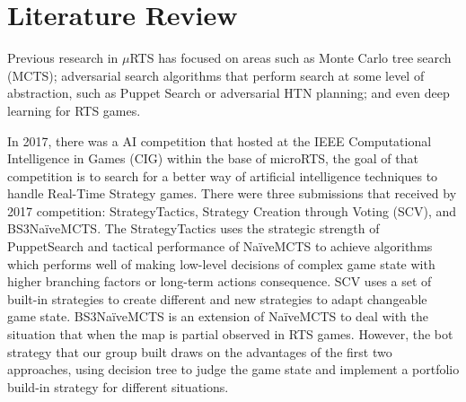 \section{Literature Review}

Previous research in $\mu$RTS has focused on areas such as Monte Carlo tree search (MCTS);
adversarial search algorithms that perform search at some level of abstraction, such as
Puppet Search or adversarial HTN planning; and even deep learning for RTS games\cite{ontanon2018first}.

In 2017, there was a AI competition that hosted at the IEEE Computational Intelligence in
Games (CIG) within the base of microRTS, the goal of that competition is to search for a
better way of artificial intelligence techniques to handle Real-Time Strategy games.
There were three submissions that received by 2017 competition: StrategyTactics\cite{barriga2017combining},
Strategy Creation through Voting (SCV)\cite{silva2018strategy}, and BS3NaïveMCTS\cite{uriarte2015automatic}.
The StrategyTactics uses the strategic strength of PuppetSearch and tactical performance of NaïveMCTS
to achieve algorithms which performs well of making low-level decisions of complex game state with
higher branching factors or long-term actions consequence. SCV uses a set of built-in
strategies to create different and new strategies to adapt changeable game state. BS3NaïveMCTS
is an extension of NaïveMCTS to deal with the situation that when the map is partial observed
in RTS games. However, the bot strategy that our group built draws on the advantages of the first
two approaches, using decision tree to judge the game state and implement a portfolio build-in
strategy for different situations.
